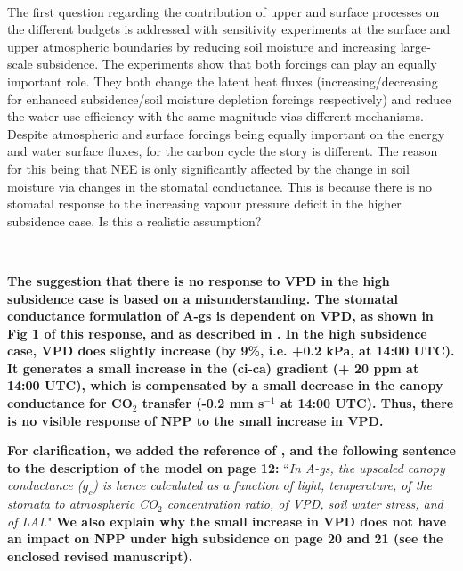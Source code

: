 \documentclass[10pt,a4paper,notitlepage,twoside]{article}
\begin{document}
\

The first question regarding the contribution of upper
and surface processes on the different budgets is addressed with sensitivity experiments at the
surface and upper atmospheric boundaries by reducing soil moisture and increasing large-scale
subsidence. The experiments show that both forcings can play an equally important role. They
both change the latent heat fluxes (increasing/decreasing for enhanced subsidence/soil moisture
depletion forcings respectively) and reduce the water use efficiency with the same magnitude
vias different mechanisms. Despite atmospheric and surface forcings being equally important
on the energy and water surface fluxes, for the carbon cycle the story is different. The reason
for this being that NEE is only significantly affected by the change in soil moisture via changes
in the stomatal conductance. This is because there is no stomatal response to the increasing
vapour pressure deficit in the higher subsidence case. Is this a realistic assumption?

\ 

\textbf{The suggestion that there is no response to VPD in the high subsidence case is based on a misunderstanding. The stomatal conductance formulation of A-gs is dependent on VPD, as shown in Fig 1 of this response, and as described in \citet{Jacobs:1996}. In the high subsidence case, VPD does slightly increase (by 9\%, i.e. +0.2 kPa, at 14:00 UTC). It generates a small increase in the (ci-ca) gradient (+ 20 ppm at 14:00 UTC), which is compensated by a small decrease in the canopy conductance for CO$_2$ transfer (-0.2 mm s$^{-1}$ at 14:00 UTC). Thus, there is no visible response of NPP to the small increase in VPD.}

\textbf{For clarification, we added the reference of \citet{Jacobs:1996}, and the following sentence to the description of the model on page 12:} 
``\textit{In A-gs, the upscaled canopy conductance ($g_c$) is hence calculated as a function of light, temperature, of the stomata to atmospheric CO$_2$ concentration ratio, of VPD, soil water stress, and of LAI.}"
\textbf{We also explain why the small increase in VPD does not have an impact on NPP under high subsidence on page 20 and 21 (see the enclosed revised manuscript).}


\end{document}
